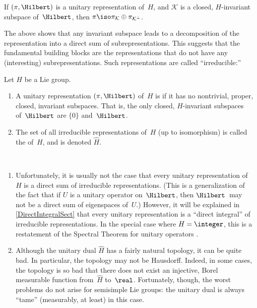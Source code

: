 \begin{lem} \label{subspace->sum}
If $(\pi,\Hilbert)$ is a unitary representation of~$H$, and $\mathcal{K}$ is a closed, $H$-invariant subspace of~$\Hilbert$, then $\pi \iso \pi_{\mathcal{K}} \oplus \pi_{\mathcal{K}^\perp}$.
\end{lem}

The above  shows that any invariant subspace leads to a decomposition of the representation into a direct sum of subrepresentations. This suggests that the fundamental building blocks are the representations that do not have any (interesting) subrepresentations. Such representations are called ``irreducible:''

\begin{defns}
Let $H$ be a Lie group.
\noprelistbreak
	\begin{enumerate}
	\item A unitary representation $(\pi,\Hilbert)$ of~$H$ is  if it has no nontrivial, proper, closed, invariant subspaces. That is, the only closed, $H$-invariant subspaces of~$\Hilbert$ are $\{0\}$ and~$\Hilbert$.
	\item The set of all irreducible representations of~$H$ (up to isomorphism) is called the  of~$H$, and is denoted $\widehat H$.
	\end{enumerate}
\end{defns}

\begin{warns} \label{UnitaryWarns} \ 
\noprelistbreak
	\begin{enumerate}
	\item Unfortunately, it is usually not the case that every unitary representation of~$H$ is a direct sum of irreducible representations. (This is a generalization of the fact that if $U$ is a unitary operator on~$\Hilbert$, then $\Hilbert$~may not be a direct sum of eigenspaces of~$U$.) However, it will be explained in \cref{DirectIntegralSect} that every unitary representation is a ``direct integral'' of irreducible representations. 
In the special case where $H = \integer$, this is a restatement of the Spectral Theorem for unitary operators \ccf{SpectralThm}.

	\item \label{UnitaryWarns-tame}
	Although the unitary dual $\widehat H$ has a fairly natural topology, it can be quite bad. In particular, the topology may not be Hausdorff. Indeed, in some cases, the topology is so bad that there does not exist an injective, Borel measurable function from~$\widehat H$ to~$\real$. Fortunately, though, the worst problems do not arise for semisimple Lie groups: the unitary dual is always ``tame'' (measurably, at least) in this case.
	
	\end{enumerate}
\end{warns}

